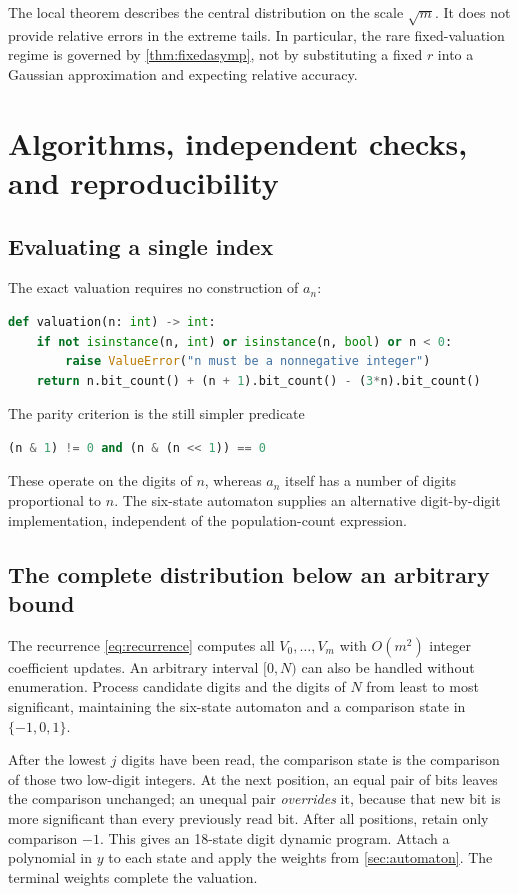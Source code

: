 \documentclass[11pt]{article}
\theoremstyle{definition}\newtheorem{definition}[theorem]{Definition}
\theoremstyle{remark}\newtheorem{remark}[theorem]{Remark}
\begin{document}
The local theorem describes the central distribution on the scale
$\sqrt m$. It does not provide relative errors in the extreme tails.
In particular, the rare fixed-valuation regime is governed by
\cref{thm:fixedasymp}, not by substituting a fixed $r$ into a Gaussian
approximation and expecting relative accuracy.

\section{Algorithms, independent checks, and reproducibility}\label{sec:algorithms}

\subsection{Evaluating a single index}
The exact valuation requires no construction of $a_n$:
\begin{lstlisting}[language=Python]
def valuation(n: int) -> int:
    if not isinstance(n, int) or isinstance(n, bool) or n < 0:
        raise ValueError("n must be a nonnegative integer")
    return n.bit_count() + (n + 1).bit_count() - (3*n).bit_count()
\end{lstlisting}
The parity criterion is the still simpler predicate
\begin{lstlisting}[language=Python]
(n & 1) != 0 and (n & (n << 1)) == 0
\end{lstlisting}
These operate on the digits of $n$, whereas $a_n$ itself has a number of
digits proportional to $n$. The six-state automaton supplies an
alternative digit-by-digit implementation, independent of the
population-count expression.

\subsection{The complete distribution below an arbitrary bound}
The recurrence \eqref{eq:recurrence} computes all $V_0,\ldots,V_m$ with
$O(m^2)$ integer coefficient updates. An arbitrary interval $[0,N)$ can
also be handled without enumeration. Process candidate digits and the
digits of $N$ from least to most significant, maintaining the six-state
automaton and a comparison state in $\{-1,0,1\}$.

After the lowest $j$ digits have been read, the comparison state is the
comparison of those two low-digit integers. At the next position, an
equal pair of bits leaves the comparison unchanged; an unequal pair
\emph{overrides} it, because that new bit is more significant than every
previously read bit. After all positions, retain only comparison $-1$.
This gives an 18-state digit dynamic program. Attach a polynomial in
$y$ to each state and apply the weights from \cref{sec:automaton}.
The terminal weights complete the valuation.
\end{document}
